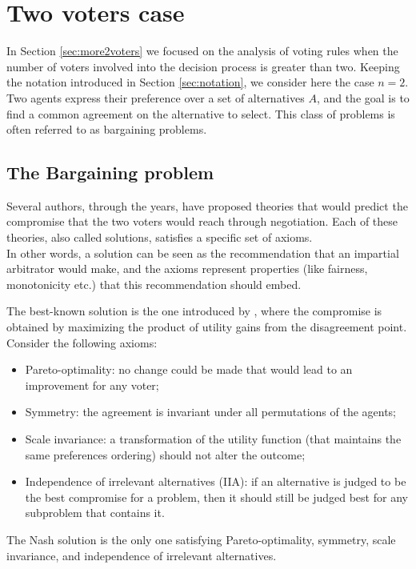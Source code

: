 \documentclass[version=3.21, pagesize, twoside=off, bibliography=totoc, DIV=calc, fontsize=12pt, a4paper]{scrartcl}
\begin{document}
\section{Two voters case}
In Section \ref{sec:more2voters} we focused on the analysis of voting rules when the number of voters involved into the decision process is greater than two. Keeping the notation introduced in Section \ref{sec:notation}, we consider here the case $n=2$. Two agents express their preference over a set of alternatives $A$, and the goal is to find a common agreement on the alternative to select. This class of problems is often referred to as bargaining problems.
\subsection{The Bargaining problem}
Several authors, through the years, have proposed theories that would predict the compromise that the two voters would reach through negotiation. Each of these theories, also called solutions, satisfies a specific set of axioms.
\\ 
In other words, a solution can be seen as the recommendation that an impartial arbitrator would make, and the axioms represent properties (like fairness, monotonicity etc.) that this recommendation should embed. 

The best-known solution is the one introduced by \cite{Nash1950}, where the compromise is obtained by maximizing the product of utility gains from the disagreement point.
Consider the following axioms:
\begin{itemize}
	\item Pareto-optimality: no change could be made that would lead to an improvement for any voter;
	\item Symmetry: the agreement is invariant under all permutations of the agents;
	\item Scale invariance: a transformation of the utility function (that maintains the same preferences ordering) should not alter the outcome;
	\item Independence of irrelevant alternatives (IIA): if an alternative is judged to be the best compromise for a problem, then it should still be judged best for any subproblem that contains it.
\end{itemize}

The Nash solution is the only one satisfying Pareto-optimality, symmetry, scale invariance, and independence of irrelevant alternatives.
\end{document}
